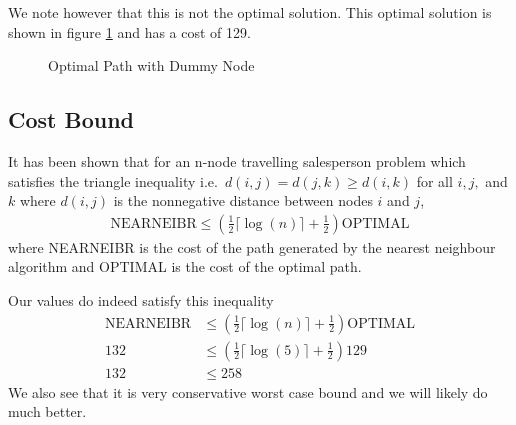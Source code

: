 We note however that this is not the optimal solution. This optimal solution is shown in 
figure \ref{fig:optDummy} and has a cost of 129.

\begin{figure}
\centering
{}
\caption{Optimal Path with Dummy Node}
\label{fig:optDummy}
\end{figure}


\subsection{Cost Bound}

It has been shown \cite{rosenkrantz74} that for an n-node travelling salesperson problem which satisfies the triangle inequality i.e.\ $d(i,j) = d(j,k) \geq d(i,k)$ for all $i,j,$ and $k$ where $d(i,j)$ is the nonnegative distance between nodes $i$ and $j$, 
\begin{align*}
\text{NEARNEIBR} \leq (\frac{1}{2} \lceil \log(n) \rceil + \frac{1}{2})\text{OPTIMAL}
\end{align*}
where NEARNEIBR is the cost of the path generated by the nearest neighbour algorithm and OPTIMAL is the cost of the optimal path. 

Our values do indeed satisfy this inequality
\begin{align*}
\text{NEARNEIBR} &\leq (\frac{1}{2} \lceil \log(n) \rceil + \frac{1}{2})\text{OPTIMAL} \\
132 &\leq (\frac{1}{2} \lceil \log(5) \rceil + \frac{1}{2})129 \\
132 &\leq 258 
\end{align*}
We also see that it is very conservative worst case bound and we will likely do much better.

